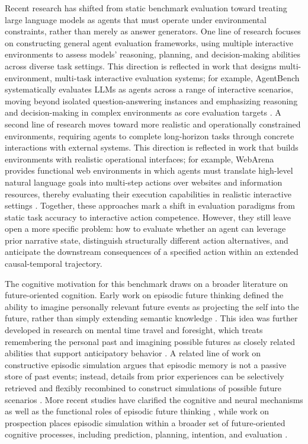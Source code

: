 \documentclass[pdflatex,sn-mathphys-num]{sn-jnl}%
\theoremstyle{thmstyleone}%
\theoremstyle{thmstyletwo}%
\theoremstyle{thmstylethree}%
\begin{document}
Recent research has shifted from static benchmark evaluation toward treating large language models as agents that must operate under environmental constraints, rather than merely as answer generators. One line of research focuses on constructing general agent evaluation frameworks, using multiple interactive environments to assess models' reasoning, planning, and decision-making abilities across diverse task settings. This direction is reflected in work that designs multi-environment, multi-task interactive evaluation systems; for example, AgentBench systematically evaluates LLMs as agents across a range of interactive scenarios, moving beyond isolated question-answering instances and emphasizing reasoning and decision-making in complex environments as core evaluation targets \cite{liu2023agentbench}. A second line of research moves toward more realistic and operationally constrained environments, requiring agents to complete long-horizon tasks through concrete interactions with external systems. This direction is reflected in work that builds environments with realistic operational interfaces; for example, WebArena provides functional web environments in which agents must translate high-level natural language goals into multi-step actions over websites and information resources, thereby evaluating their execution capabilities in realistic interactive settings \cite{zhou2023webarena}. Together, these approaches mark a shift in evaluation paradigms from static task accuracy to interactive action competence. However, they still leave open a more specific problem: how to evaluate whether an agent can leverage prior narrative state, distinguish structurally different action alternatives, and anticipate the downstream consequences of a specified action within an extended causal-temporal trajectory.

The cognitive motivation for this benchmark draws on a broader literature on future-oriented cognition. Early work on episodic future thinking defined the ability to imagine personally relevant future events as projecting the self into the future, rather than simply extending semantic knowledge \cite{atance2001episodic}. This idea was further developed in research on mental time travel and foresight, which treats remembering the personal past and imagining possible futures as closely related abilities that support anticipatory behavior \cite{suddendorf2007evolution}. A related line of work on constructive episodic simulation argues that episodic memory is not a passive store of past events; instead, details from prior experiences can be selectively retrieved and flexibly recombined to construct simulations of possible future scenarios \cite{schacter2007cognitive}. More recent studies have clarified the cognitive and neural mechanisms as well as the functional roles of episodic future thinking \cite{schacter2017episodic}, while work on prospection places episodic simulation within a broader set of future-oriented cognitive processes, including prediction, planning, intention, and evaluation \cite{szpunar2014taxonomy}.
\end{document}
